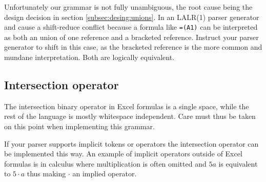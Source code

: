 \documentclass[conference]{IEEEtran}
\newcommand{\todo}[1]{\textbf{TODO: #1}}
\begin{document}
Unfortunately our grammar is not fully unambiguous, the root cause being the design decision in section \ref{subsec:desing:unions}.
In an LALR(1) parser generator  and  cause a shift-reduce conflict because a formula like \texttt{=(A1)} can be interpreted as both an union of one reference and a bracketed reference.
Instruct your parser generator to shift in this case, as the bracketed reference is the more common and mundane interpretation.
Both are logically equivalent.





\subsection{Intersection operator}

The intersection binary operator in Excel formulas is a single space, while the rest of the language is mostly whitespace independent.
Care must thus be taken on this point when implementing this grammar.

If your parser supports implicit tokens or operators the intersection operator can be implemented this way.
An example of implicit operators outside of Excel formulas is in calculus where multiplication is often omitted and $5a$ is equivalent to $5 \cdot a$ thus making $\cdot$ an implied operator.
\end{document}
